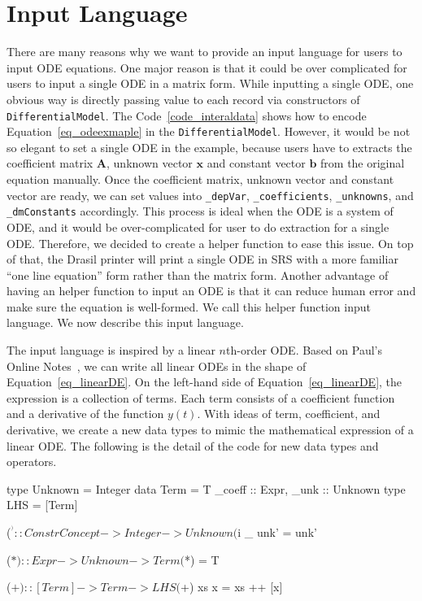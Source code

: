 \section{Input Language}
\label{sec_input}
There are many reasons why we want to provide an input language for users to input ODE equations. One major reason is that it could be over complicated for users to input a single ODE in a matrix form. While inputting a single ODE, one obvious way is directly passing value to each record via constructors of \verb|DifferentialModel|. The Code~\ref{code_interaldata} shows how to encode Equation~\ref{eq_odeexmaple} in the \verb|DifferentialModel|. However, it would be not so elegant to set a single ODE in the example, because users have to extracts the coefficient matrix $\boldsymbol{A}$, unknown vector $\boldsymbol{x}$ and constant vector $\boldsymbol{b}$ from the original equation manually. Once the coefficient matrix, unknown vector and constant vector are ready, we can set values into \verb|_depVar|, \verb|_coefficients|, \verb|_unknowns|, and \verb|_dmConstants| accordingly. This process is ideal when the ODE is a system of ODE, and it would be over-complicated for user to do extraction for a single ODE. Therefore, we decided to create a helper function to ease this issue. On top of that, the Drasil printer will print a single ODE in SRS with a more familiar ``one line equation'' form rather than the matrix form. Another advantage of having an helper function to input an ODE is that it can reduce human error and make sure the equation is well-formed. We call this helper function input language. We now describe this input language.

The input language is inspired by a linear $n$th-order ODE. Based on Paul's Online Notes~\citep{paullinearode}, we can write all linear ODEs in the shape of Equation~\ref{eq_linearDE}. On the left-hand side of Equation~\ref{eq_linearDE}, the expression is a collection of terms. Each term consists of a coefficient function and a derivative of the function $y(t)$. With ideas of term, coefficient, and derivative, we create a new data types to mimic the mathematical expression of a linear ODE. The following is the detail of the code for new data types and operators.

\begin{haskell1}
type Unknown = Integer
data Term = T{
	_coeff :: Expr,
	_unk :: Unknown
}
type LHS = [Term]

($^^) :: ConstrConcept -> Integer -> Unknown
($^^) _ unk' = unk'

($*) :: Expr -> Unknown -> Term
($*) = T

($+) :: [Term] -> Term -> LHS
($+) xs x  = xs ++ [x]
\end{haskell1}

